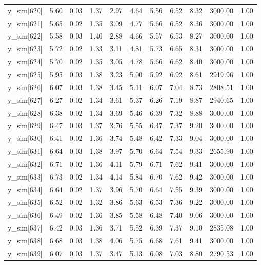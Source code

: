 \begin{table}[ht]
\begin{tabular}{rrrrrrrrrrr}
  y\_sim[620] & 5.60 & 0.03 & 1.37 & 2.97 & 4.64 & 5.56 & 6.52 & 8.32 & 3000.00 & 1.00 \\ 
  y\_sim[621] & 5.65 & 0.02 & 1.35 & 3.09 & 4.77 & 5.66 & 6.52 & 8.36 & 3000.00 & 1.00 \\ 
  y\_sim[622] & 5.58 & 0.03 & 1.40 & 2.88 & 4.66 & 5.57 & 6.53 & 8.27 & 3000.00 & 1.00 \\ 
  y\_sim[623] & 5.72 & 0.02 & 1.33 & 3.11 & 4.81 & 5.73 & 6.65 & 8.31 & 3000.00 & 1.00 \\ 
  y\_sim[624] & 5.70 & 0.02 & 1.35 & 3.05 & 4.78 & 5.66 & 6.62 & 8.40 & 3000.00 & 1.00 \\ 
  y\_sim[625] & 5.95 & 0.03 & 1.38 & 3.23 & 5.00 & 5.92 & 6.92 & 8.61 & 2919.96 & 1.00 \\ 
  y\_sim[626] & 6.07 & 0.03 & 1.38 & 3.45 & 5.11 & 6.07 & 7.04 & 8.73 & 2808.51 & 1.00 \\ 
  y\_sim[627] & 6.27 & 0.02 & 1.34 & 3.61 & 5.37 & 6.26 & 7.19 & 8.87 & 2940.65 & 1.00 \\ 
  y\_sim[628] & 6.38 & 0.02 & 1.34 & 3.69 & 5.46 & 6.39 & 7.32 & 8.88 & 3000.00 & 1.00 \\ 
  y\_sim[629] & 6.47 & 0.03 & 1.37 & 3.76 & 5.55 & 6.47 & 7.37 & 9.20 & 3000.00 & 1.00 \\ 
  y\_sim[630] & 6.41 & 0.02 & 1.36 & 3.74 & 5.48 & 6.42 & 7.33 & 9.04 & 3000.00 & 1.00 \\ 
  y\_sim[631] & 6.64 & 0.03 & 1.38 & 3.97 & 5.70 & 6.64 & 7.54 & 9.33 & 2655.90 & 1.00 \\ 
  y\_sim[632] & 6.71 & 0.02 & 1.36 & 4.11 & 5.79 & 6.71 & 7.62 & 9.41 & 3000.00 & 1.00 \\ 
  y\_sim[633] & 6.73 & 0.02 & 1.34 & 4.14 & 5.84 & 6.70 & 7.62 & 9.42 & 3000.00 & 1.00 \\ 
  y\_sim[634] & 6.64 & 0.02 & 1.37 & 3.96 & 5.70 & 6.64 & 7.55 & 9.39 & 3000.00 & 1.00 \\ 
  y\_sim[635] & 6.52 & 0.02 & 1.32 & 3.86 & 5.63 & 6.53 & 7.36 & 9.22 & 3000.00 & 1.00 \\ 
  y\_sim[636] & 6.49 & 0.02 & 1.36 & 3.85 & 5.58 & 6.48 & 7.40 & 9.06 & 3000.00 & 1.00 \\ 
  y\_sim[637] & 6.42 & 0.03 & 1.36 & 3.71 & 5.52 & 6.39 & 7.37 & 9.10 & 2835.08 & 1.00 \\ 
  y\_sim[638] & 6.68 & 0.03 & 1.38 & 4.06 & 5.75 & 6.68 & 7.61 & 9.41 & 3000.00 & 1.00 \\ 
  y\_sim[639] & 6.07 & 0.03 & 1.37 & 3.47 & 5.13 & 6.08 & 7.03 & 8.80 & 2790.53 & 1.00 \\ 

\end{tabular}
\end{table}

